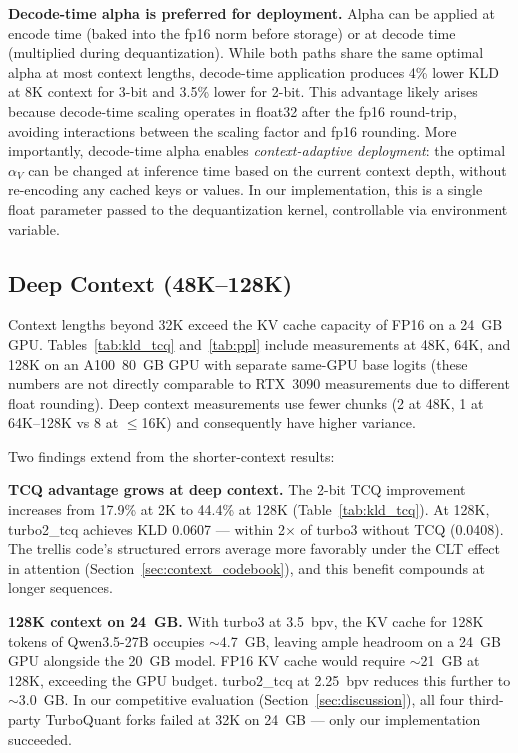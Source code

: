 \documentclass{article}
\begin{document}
\textbf{Decode-time alpha is preferred for deployment.}
Alpha can be applied at encode time (baked into the fp16 norm before storage)
or at decode time (multiplied during dequantization). While both paths share
the same optimal alpha at most context lengths, decode-time application
produces 4\% lower KLD at 8K context for 3-bit and 3.5\% lower for 2-bit.
This advantage likely arises because decode-time scaling operates in float32
after the fp16 round-trip, avoiding interactions between the scaling factor
and fp16 rounding. More importantly, decode-time alpha enables
\emph{context-adaptive deployment}: the optimal $\alpha_V$ can be changed at
inference time based on the current context depth, without re-encoding any
cached keys or values. In our implementation, this is a single float
parameter passed to the dequantization kernel, controllable via environment
variable.

\subsection{Deep Context (48K--128K)}
\label{sec:deep_context}

Context lengths beyond 32K exceed the KV cache capacity of FP16 on a 24~GB GPU.
Tables~\ref{tab:kld_tcq} and~\ref{tab:ppl} include measurements at 48K, 64K,
and 128K on an A100~80~GB GPU with separate same-GPU base logits (these numbers
are not directly comparable to RTX~3090 measurements due to different float
rounding). Deep context measurements use fewer chunks (2 at 48K, 1 at
64K--128K vs 8 at $\leq$16K) and consequently have higher variance.

Two findings extend from the shorter-context results:

\textbf{TCQ advantage grows at deep context.} The 2-bit TCQ improvement
increases from 17.9\% at 2K to 44.4\% at 128K (Table~\ref{tab:kld_tcq}). At
128K, turbo2\_tcq achieves KLD 0.0607 --- within 2$\times$ of turbo3 without
TCQ (0.0408). The trellis code's structured errors average more favorably under
the CLT effect in attention (Section~\ref{sec:context_codebook}), and this
benefit compounds at longer sequences.

\textbf{128K context on 24~GB.} With turbo3 at 3.5~bpv, the KV cache for 128K
tokens of Qwen3.5-27B occupies $\sim$4.7~GB, leaving ample headroom on a 24~GB
GPU alongside the 20~GB model. FP16 KV cache would require $\sim$21~GB at 128K,
exceeding the GPU budget. turbo2\_tcq at 2.25~bpv reduces this further to
$\sim$3.0~GB. In our competitive evaluation
(Section~\ref{sec:discussion}), all four third-party TurboQuant forks
failed at 32K on 24~GB --- only our implementation succeeded.
\end{document}
